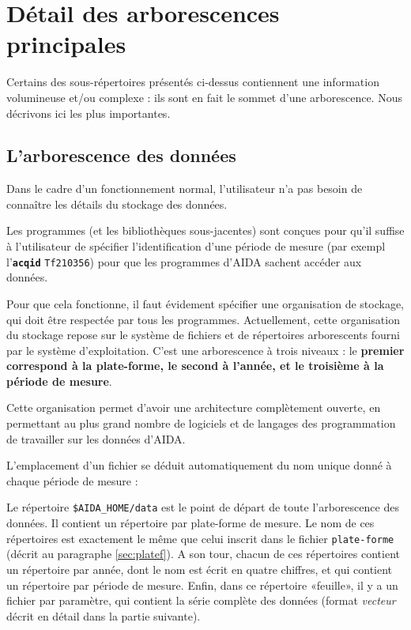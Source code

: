 \section{Détail des arborescences principales}

Certains des sous-répertoires présentés ci-dessus contiennent
une information volumineuse et/ou complexe : ils sont en fait le sommet
d'une arborescence. Nous décrivons ici les plus importantes.

\subsection{L'arborescence des données} 
\label{sec:arbodata}

    Dans le cadre d'un fonctionnement normal, l'utilisateur 
n'a pas besoin de connaître les détails du stockage
des données.

    Les programmes (et les bibliothèques sous-jacentes) sont conçues 
pour qu'il suffise à l'utilisateur de spécifier 
l'identification d'une période de mesure (par exempl
 l'\textbf{\texttt{acqid}} \texttt{Tf210356})
pour que les programmes d'AIDA sachent accéder aux données.

   Pour que cela fonctionne, il faut évidement spécifier une 
organisation de stockage, qui doit être respectée par tous les 
programmes.  Actuellement, cette organisation du stockage repose
sur le système de fichiers et de répertoires arborescents 
fourni par le système d'exploitation. C'est une arborescence 
à trois niveaux : le \textbf{premier correspond à la plate-forme,
le second à l'année, et le troisième à la période de mesure}.

    Cette organisation permet d'avoir une architecture complètement
ouverte, en permettant au plus grand nombre de logiciels
et de langages des programmation de travailler sur les données d'AIDA.

    L'emplacement d'un fichier se déduit automatiquement
du nom unique donné à chaque période de mesure :

    Le répertoire \texttt{\$AIDA\_HOME\//data} est le
point de départ de toute l'arborescence des données. Il contient un
répertoire par plate-forme de mesure. Le nom de ces répertoires
est exactement le même que celui inscrit dans le fichier
\texttt{plate-forme} (décrit au paragraphe \ref{sec:platef}).
A son tour, chacun de ces répertoires contient un répertoire par 
année, dont le nom est écrit en quatre chiffres, et qui contient
un répertoire par période de mesure. Enfin, dans ce répertoire
«feuille», il y a un fichier par
paramètre, qui contient la série complète des données (format
\textit{vecteur} décrit en détail dans la partie suivante).

